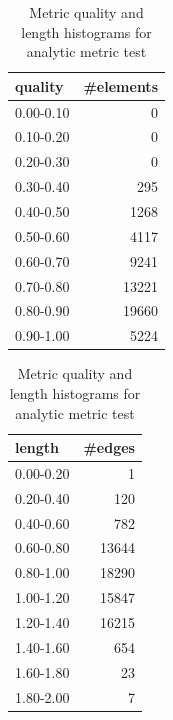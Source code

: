 \begin{table}
\caption{Metric quality and length histograms for analytic metric test}
\label{tab:ugawg}
\begin{center}
\begin{tabular}{l|r}
quality & \#elements \\ \hline
0.00-0.10 & 0 \\
0.10-0.20 & 0 \\
0.20-0.30 & 0 \\
0.30-0.40 & 295 \\
0.40-0.50 & 1268 \\
0.50-0.60 & 4117 \\
0.60-0.70 & 9241 \\
0.70-0.80 & 13221 \\
0.80-0.90 & 19660 \\
0.90-1.00 & 5224 \\
\end{tabular}
\quad\quad
\begin{tabular}{l|r}
length & \#edges \\ \hline
0.00-0.20 & 1 \\
0.20-0.40 & 120 \\
0.40-0.60 & 782 \\
0.60-0.80 & 13644 \\
0.80-1.00 & 18290 \\
1.00-1.20 & 15847 \\
1.20-1.40 & 16215 \\
1.40-1.60 & 654 \\
1.60-1.80 & 23 \\
1.80-2.00 & 7 \\
\end{tabular}
\end{center}
\end{table}



